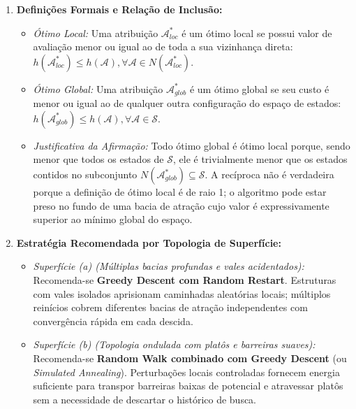 \begin{enumerate}[label=(\alph*)]
    \item \textbf{Definições Formais e Relação de Inclusão:}
    \begin{itemize}
        \item \textit{Ótimo Local:} Uma atribuição $\mathcal{A}^*_{loc}$ é um ótimo local se possui valor de avaliação menor ou igual ao de toda a sua vizinhança direta: $h(\mathcal{A}^*_{loc}) \le h(\mathcal{A}), \forall \mathcal{A} \in N(\mathcal{A}^*_{loc})$.
        \item \textit{Ótimo Global:} Uma atribuição $\mathcal{A}^*_{glob}$ é um ótimo global se seu custo é menor ou igual ao de qualquer outra configuração do espaço de estados: $h(\mathcal{A}^*_{glob}) \le h(\mathcal{A}), \forall \mathcal{A} \in \mathcal{S}$.
        \item \textit{Justificativa da Afirmação:} Todo ótimo global é ótimo local porque, sendo menor que todos os estados de $\mathcal{S}$, ele é trivialmente menor que os estados contidos no subconjunto $N(\mathcal{A}^*_{glob}) \subseteq \mathcal{S}$. A recíproca não é verdadeira porque a definição de ótimo local é de raio 1; o algoritmo pode estar preso no fundo de uma bacia de atração cujo valor é expressivamente superior ao mínimo global do espaço.
    \end{itemize}

    \item \textbf{Estratégia Recomendada por Topologia de Superfície:}
    \begin{itemize}
        \item \textit{Superfície (a) (Múltiplas bacias profundas e vales acidentados):} Recomenda-se \textbf{Greedy Descent com Random Restart}. Estruturas com vales isolados aprisionam caminhadas aleatórias locais; múltiplos reinícios cobrem diferentes bacias de atração independentes com convergência rápida em cada descida.
        \item \textit{Superfície (b) (Topologia ondulada com platôs e barreiras suaves):} Recomenda-se \textbf{Random Walk combinado com Greedy Descent} (ou \textit{Simulated Annealing}). Perturbações locais controladas fornecem energia suficiente para transpor barreiras baixas de potencial e atravessar platôs sem a necessidade de descartar o histórico de busca.
    \end{itemize}


\end{enumerate}
